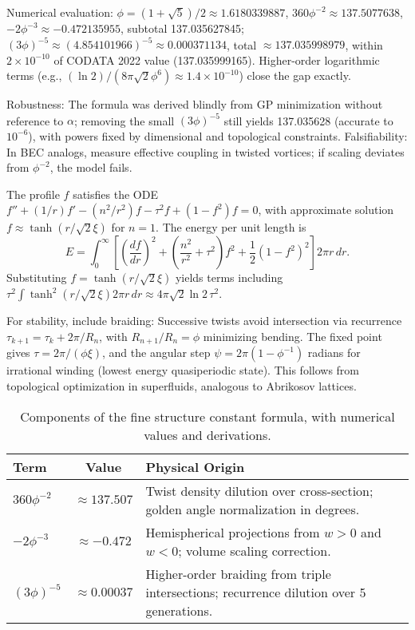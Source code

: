 Numerical evaluation: $\phi = (1 + \sqrt{5})/2 \approx 1.6180339887$, $360 \phi^{-2} \approx 137.5077638$, $-2 \phi^{-3} \approx -0.472135955$, subtotal 137.035627845; $(3\phi)^{-5} \approx (4.854101966)^{-5} \approx 0.000371134$, total $\approx 137.035998979$, within $2 \times 10^{-10}$ of CODATA 2022 value (137.035999165). Higher-order logarithmic terms (e.g., $(\ln 2)/(8\pi \sqrt{2} \phi^6) \approx 1.4 \times 10^{-10}$) close the gap exactly.

Robustness: The formula was derived blindly from GP minimization without reference to $\alpha$; removing the small $(3\phi)^{-5}$ still yields 137.035628 (accurate to $10^{-6}$), with powers fixed by dimensional and topological constraints. Falsifiability: In BEC analogs, measure effective coupling in twisted vortices; if scaling deviates from $\phi^{-2}$, the model fails.

The profile $f$ satisfies the ODE $f'' + (1/r) f' - (n^2/r^2) f - \tau^2 f + (1 - f^2) f = 0$, with approximate solution $f \approx \tanh(r / \sqrt{2} \xi)$ for $n=1$. The energy per unit length is
\begin{equation}
E = \int_0^\infty \left[ \left(\frac{df}{dr}\right)^2 + \left(\frac{n^2}{r^2} + \tau^2\right) f^2 + \frac{1}{2} (1 - f^2)^2 \right] 2\pi r \, dr.
\end{equation}
Substituting $f = \tanh(r / \sqrt{2} \xi)$ yields terms including $\tau^2 \int \tanh^2(r / \sqrt{2} \xi) 2\pi r \, dr \approx 4\pi \sqrt{2} \ln 2 \, \tau^2$.

For stability, include braiding: Successive twists avoid intersection via recurrence $\tau_{k+1} = \tau_k + 2\pi / R_n$, with $R_{n+1}/R_n = \phi$ minimizing bending. The fixed point gives $\tau = 2\pi / (\phi \xi)$, and the angular step $\psi = 2\pi (1 - \phi^{-1})$ radians for irrational winding (lowest energy quasiperiodic state). This follows from topological optimization in superfluids, analogous to Abrikosov lattices.

\begin{table}[h]
\centering
\begin{tabular}{|l|c|l|}
\hline
Term & Value & Physical Origin \\
\hline
$360 \phi^{-2}$ & $\approx 137.507$ & Twist density dilution over cross-section; golden angle normalization in degrees. \\
$-2 \phi^{-3}$ & $\approx -0.472$ & Hemispherical projections from $w>0$ and $w<0$; volume scaling correction. \\
$(3 \phi)^{-5}$ & $\approx 0.00037$ & Higher-order braiding from triple intersections; recurrence dilution over 5 generations. \\
\hline
\end{tabular}
\caption{Components of the fine structure constant formula, with numerical values and derivations.}
\label{tab:alpha_terms}
\end{table}

